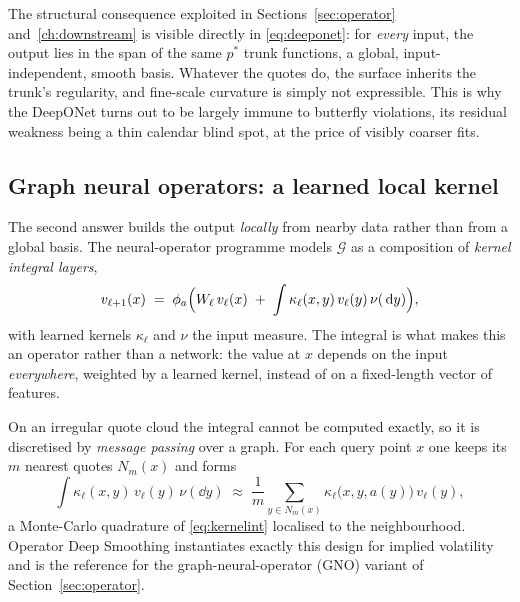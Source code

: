 The structural consequence exploited in Sections~\ref{sec:operator} and~\ref{ch:downstream} is
visible directly in \eqref{eq:deeponet}: for \emph{every} input, the output lies in the span of
the same $p^\ast$ trunk functions, a global, input-independent, smooth basis. Whatever the quotes
do, the surface inherits the trunk's regularity, and fine-scale curvature is simply not
expressible. This is why the DeepONet turns out to be largely immune to butterfly violations,
its residual weakness being a thin calendar blind spot, at the price of visibly coarser fits.

\subsection{Graph neural operators: a learned local kernel}

The second answer builds the output \emph{locally} from nearby data rather than from a global
basis. The neural-operator programme \cite{li2020gno,li2021fno,kovachki2023} models $\mathcal G$
as a composition of \emph{kernel integral layers},
\begin{equation}\label{eq:kernelint}
v_{\ell+1}(x)\;=\;\phi_a\Bigl(W_\ell\,v_\ell(x)\;+\;\int\kappa_\ell(x,y)\,v_\ell(y)\,
\nu(\,\mathrm{d} y)\Bigr),
\end{equation}
with learned kernels $\kappa_\ell$ and $\nu$ the input measure. The integral is what makes this
an operator rather than a network: the value at $x$ depends on the input \emph{everywhere},
weighted by a learned kernel, instead of on a fixed-length vector of features.

On an irregular quote cloud the integral cannot be computed exactly, so it is discretised by
\emph{message passing} over a graph. For each query point $x$ one keeps its $m$ nearest quotes
$N_m(x)$ and forms
\begin{equation}\label{eq:gno}
\int\kappa_\ell(x,y)\,v_\ell(y)\,\nu(\dd y)\;\approx\;
\frac{1}{m}\sum_{y\in N_m(x)}\kappa_\ell\bigl(x,y,a(y)\bigr)\,v_\ell(y),
\end{equation}
a Monte-Carlo quadrature of \eqref{eq:kernelint} localised to the neighbourhood. Operator Deep
Smoothing \cite{wiedemann2025} instantiates exactly this design for implied volatility and is
the reference for the graph-neural-operator (GNO) variant of Section~\ref{sec:operator}.

